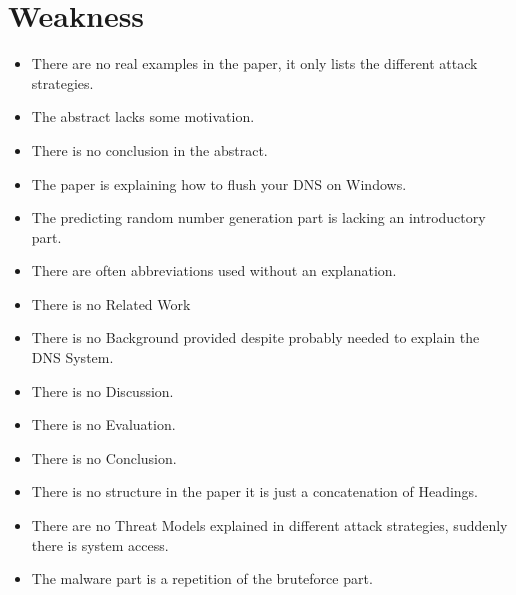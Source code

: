 \documentclass[peerreview, 10pt, onecolumn]{IEEEtran}
\begin{document}
\section*{Weakness}
    \begin{itemize}
        \renewcommand\labelitemi{-}
        \item There are no real examples in the paper, it only lists the different attack strategies.
        \item The abstract lacks some motivation.
        \item There is no conclusion in the abstract.
        \item The paper is explaining how to flush your DNS on Windows.
        \item The predicting random number generation part is lacking an introductory part.
        \item There are often abbreviations used without an explanation.
        \item There is no Related Work
        \item There is no Background provided despite probably needed to explain the DNS System.
        \item There is no Discussion.
        \item There is no Evaluation.
        \item There is no Conclusion.
        \item There is no structure in the paper it is just a concatenation of Headings.
        \item There are no Threat Models explained in different attack strategies, suddenly there is system access.
        \item The malware part is a repetition of the bruteforce part. 
    \end{itemize}
\end{document}
